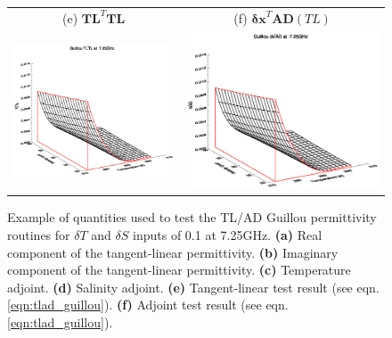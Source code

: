 \begin{figure}[htp]
\begin{tabular}{c c}
    \textsf{(e)} $\mathbf{TL}^{T}\mathbf{TL}$ &
    \textsf{(f)} $\mathbf{\delta x}^{T}\mathbf{AD}(TL)$ \\
    \includegraphics[bb=120 240 508 540,clip,scale=0.5]{graphics/Guillou/TLAD/TLtTL_7.25GHz.eps} & 
    \includegraphics[bb=120 240 508 540,clip,scale=0.5]{graphics/Guillou/TLAD/dxtAD_7.25GHz.eps}
  \end{tabular}
  \caption{Example of quantities used to test the TL/AD Guillou permittivity routines for $\delta{T}$ and $\delta{S}$ inputs of 0.1 at 7.25GHz. \textbf{(a)} Real component of the tangent-linear permittivity.  \textbf{(b)} Imaginary component of the tangent-linear permittivity. \textbf{(c)} Temperature adjoint. \textbf{(d)} Salinity adjoint. \textbf{(e)} Tangent-linear test result (see eqn.\ref{eqn:tlad_guillou}). \textbf{(f)} Adjoint test result (see eqn.\ref{eqn:tlad_guillou}).}
  \label{fig:tlad_7.25GHz_guillou}
\end{figure}

